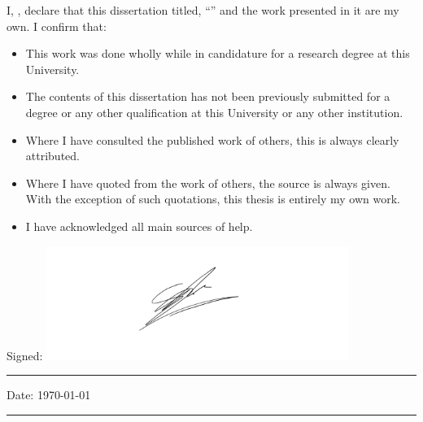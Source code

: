 \documentclass[
12pt, %
english, %
singlespacing, %
parskip, %
headsepline, %
openany %
]{MastersDoctoralThesis} %
\numberwithin{theorem}{section}
\numberwithin{remark}{section}
\numberwithin{assumption}{section}
\begin{document}

\begin{declaration}
\addchaptertocentry{\authorshipname} 
\vspace{1.5cm}

\noindent I, \authorname, declare that this dissertation titled, \enquote{\ttitle} and the work presented in it are my own. I confirm that:

\begin{itemize} 
\item This work was done wholly while in candidature for a research degree at this University.
\item The contents of this dissertation has not been previously submitted for a degree or any other qualification at this University or any other institution.
\item Where I have consulted the published work of others, this is always clearly attributed.
\item Where I have quoted from the work of others, the source is always given. With the exception of such quotations, this thesis is entirely my own work.
\item I have acknowledged all main sources of help.
\end{itemize}

\vspace{1cm}
\noindent Signed: \includegraphics[height=10em]{Figures/sig.png} \\ %
\rule[0.5em]{25em}{0.5pt} %
 
\noindent Date: \today \\
\rule[0.5em]{25em}{0.5pt} %
\end{declaration}

\cleardoublepage

\end{document}
